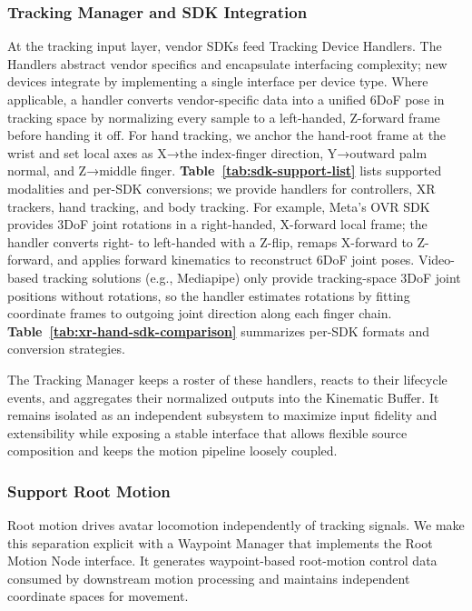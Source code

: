 \subsubsection{Tracking Manager and SDK Integration}
At the tracking input layer, vendor SDKs feed Tracking Device Handlers.
The Handlers abstract vendor specifics and encapsulate interfacing complexity; new devices integrate by implementing a single interface per device type.
Where applicable, a handler converts vendor-specific data into a unified 6DoF pose in tracking space by normalizing every sample to a left-handed, Z-forward frame before handing it off.
For hand tracking, we anchor the hand-root frame at the wrist and set local axes as X→the index-finger direction, Y→outward palm normal, and Z→middle finger.
{\bf Table~\ref{tab:sdk-support-list}} lists supported modalities and per-SDK conversions; we provide handlers for controllers, XR trackers, hand tracking, and body tracking.
For example, Meta’s OVR SDK provides 3DoF joint rotations in a right-handed, X-forward local frame; the handler converts right- to left-handed with a Z-flip, remaps X-forward to Z-forward, and applies forward kinematics to reconstruct 6DoF joint poses.
Video-based tracking solutions (e.g., Mediapipe) only provide tracking-space 3DoF joint positions without rotations, so the handler estimates rotations by fitting coordinate frames to outgoing joint direction along each finger chain.
{\bf Table~\ref{tab:xr-hand-sdk-comparison}} summarizes per-SDK formats and conversion strategies.

The Tracking Manager keeps a roster of these handlers, reacts to their lifecycle events, and aggregates their normalized outputs into the Kinematic Buffer. 
It remains isolated as an independent subsystem to maximize input fidelity and extensibility while exposing a stable interface that allows flexible source composition and keeps the motion pipeline loosely coupled. 

\subsubsection{Support Root Motion}
Root motion drives avatar locomotion independently of tracking signals.
We make this separation explicit with a Waypoint Manager that implements the Root Motion Node interface.
It generates waypoint-based root-motion control data consumed by downstream motion processing and maintains independent coordinate spaces for movement.
